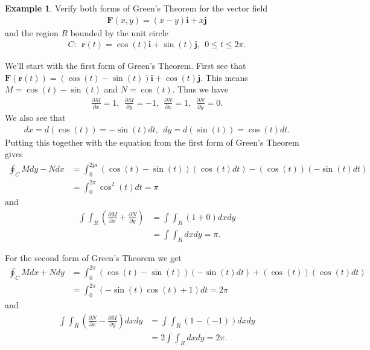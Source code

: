 \documentclass[12pt, letter]{article}
\theoremstyle{plain}
\numberwithin{theorem}{section}
\theoremstyle{definition}
\newtheorem{example}[theorem]{Example}
\begin{document}
\begin{example}
Verify both forms of Green's Theorem for the vector field
\begin{align*}
\bm{F}(x,y)=(x-y)\bm{i}+x\bm{j}
\end{align*}
and the region $R$ bounded by the unit circle
\begin{align*}
C: \ \ \bm{r}(t)=\cos(t)\bm{i}+\sin(t)\bm{j}, \ \ 0\leq t\leq 2\pi.
\end{align*}

\bigskip

We'll start with the first form of Green's Theorem. First see that $\bm{F}(\bm{r}(t)) = (\cos(t)-\sin(t))\bm{i} + \cos(t)\bm{j}$. This means $M=\cos(t)-\sin(t)$ and $N=\cos(t)$. Thus we have
\begin{align*}
\frac{\partial M}{\partial x} = 1, \ \ \frac{\partial M}{\partial y} = -1, \ \ \frac{\partial N}{\partial x} = 1, \ \ \frac{\partial N}{\partial y} = 0.
\end{align*}
We also see that
\begin{align*}
dx=d(\cos(t))=-\sin(t)dt, \ \ dy=d(\sin(t))=\cos(t)dt.
\end{align*}
Putting this together with the equation from the first form of Green's Theorem gives
\begin{align*}
\oint_C Mdy-Ndx &= \int_0^{2pi} (\cos(t)-\sin(t))(\cos(t)dt)-(\cos(t))(-\sin(t)dt)\\
&=\int_0^{2\pi} \cos^2(t)dt = \pi
\end{align*}
and
\begin{align*}
\int\int_R \left(\frac{\partial M}{\partial x}+\frac{\partial N}{\partial y}\right) &= \int\int_R (1+0)dxdy\\
&=\int\int_R dxdy = \pi.
\end{align*}

\smallskip

For the second form of Green's Theorem we get
\begin{align*}
\oint_C Mdx+Ndy &= \int_0^{2\pi} (\cos(t)-\sin(t))(-\sin(t)dt)+(\cos(t))(\cos(t)dt)\\
&=\int_0^{2\pi} (-\sin(t)\cos(t)+1)dt=2\pi
\end{align*}
and
\begin{align*}
\int\int_R \left(\frac{\partial N}{\partial x}-\frac{\partial M}{\partial y}\right)dxdy &= \int\int_R (1-(-1))dxdy\\
&= 2\int\int_R dxdy = 2\pi.
\end{align*}
\end{example}
\end{document}
